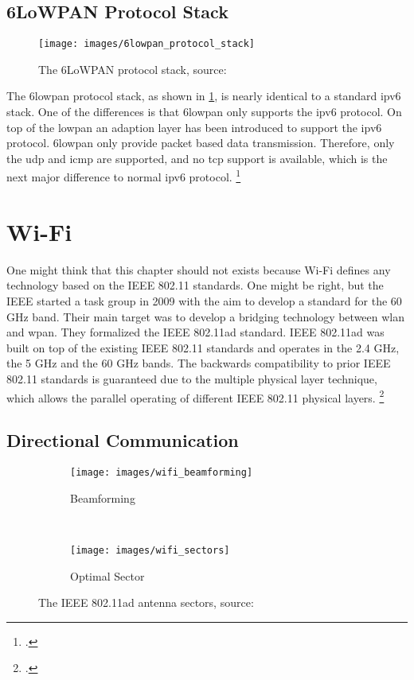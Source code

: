 \subsection{6LoWPAN Protocol Stack}

\begin{figure}[ht]
  \centering
  \texttt{[image: images/6lowpan\_protocol\_stack]}
  \caption{The 6LoWPAN protocol stack, source: \cite[16]{Shelby2009}}
  \label{fig:6lowpan_protocol_stack}
\end{figure}

The \gls{6lowpan} protocol stack, as shown in \cref{fig:6lowpan_protocol_stack}, is nearly identical to a standard \gls{ipv6} stack. One of the differences is that \gls{6lowpan} only supports the \gls{ipv6} protocol. On top of the \gls{lowpan} an adaption layer has been introduced to support the \gls{ipv6} protocol. \gls{6lowpan} only provide packet based data transmission. Therefore, only the \gls{udp} and \gls{icmp} are supported, and no \gls{tcp} support is available, which is the next major difference to normal \gls{ipv6} protocol. \footcite[Cf.][16]{Shelby2009}

\section{Wi-Fi}
\label{sec:wifi}

One might think that this chapter should not exists because Wi-Fi defines any technology based on the IEEE 802.11 standards. One might be right, but the IEEE started a task group in 2009 with the aim to develop a standard for the 60 GHz band. Their main target was to develop a bridging technology between \gls{wlan} and \gls{wpan}. They formalized the IEEE 802.11ad standard. IEEE 802.11ad was built on top of the existing IEEE 802.11 standards and operates in the 2.4 GHz, the 5 GHz and the 60 GHz bands. The backwards compatibility to prior IEEE 802.11 standards is guaranteed due to the multiple physical layer technique, which allows the parallel operating of different IEEE 802.11 physical layers. \footcite[Cf.][1]{Zhu2011}

\subsection{Directional Communication}

\begin{figure}[ht]
  \centering
  \begin{subfigure}[t]{10cm}
    \texttt{[image: images/wifi\_beamforming]}
    \caption{Beamforming}
    \label{fig:wifi_beamforming}
  \end{subfigure}
  ~
  \begin{subfigure}[t]{5cm}
    \texttt{[image: images/wifi\_sectors]}
    \caption{Optimal Sector}
    \label{fig:wifi_sectors}
  \end{subfigure}
  \caption{The IEEE 802.11ad antenna sectors, source: \cite[2-7]{Nitsche2014}}
  \label{fig:wifi_directional}
\end{figure}

